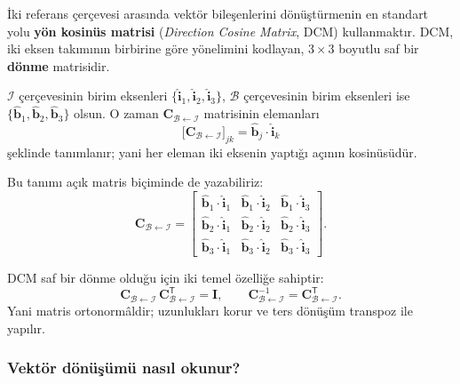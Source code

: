 İki referans çerçevesi arasında vektör bileşenlerini dönüştürmenin en standart yolu \textbf{yön kosinüs matrisi}
(\emph{Direction Cosine Matrix}, DCM) kullanmaktır. DCM, iki eksen takımının birbirine göre yönelimini kodlayan,
\textbf{$3\times3$} boyutlu saf bir \textbf{dönme} matrisidir.

$\mathcal I$ çerçevesinin birim eksenleri
$\{\hat{\mathbf i}_1,\hat{\mathbf i}_2,\hat{\mathbf i}_3\}$, $\mathcal B$ çerçevesinin birim eksenleri ise
$\{\hat{\mathbf b}_1,\hat{\mathbf b}_2,\hat{\mathbf b}_3\}$ olsun. O zaman
$\mathbf C_{\mathcal B\leftarrow\mathcal I}$ matrisinin elemanları
\begin{equation}
\label{eq:dcm_elements}
\big[\mathbf C_{\mathcal B\leftarrow\mathcal I}\big]_{jk}
=\hat{\mathbf b}_j \cdot \hat{\mathbf i}_k
\end{equation}
şeklinde tanımlanır; yani her eleman iki eksenin yaptığı açının kosinüsüdür.

Bu tanımı açık matris biçiminde de yazabiliriz:
\begin{equation}
\label{eq:dcm_matrix}
\mathbf C_{\mathcal B\leftarrow\mathcal I}=
\begin{bmatrix}
\hat{\mathbf b}_1\!\cdot\!\hat{\mathbf i}_1 & \hat{\mathbf b}_1\!\cdot\!\hat{\mathbf i}_2 & \hat{\mathbf b}_1\!\cdot\!\hat{\mathbf i}_3\\
\hat{\mathbf b}_2\!\cdot\!\hat{\mathbf i}_1 & \hat{\mathbf b}_2\!\cdot\!\hat{\mathbf i}_2 & \hat{\mathbf b}_2\!\cdot\!\hat{\mathbf i}_3\\
\hat{\mathbf b}_3\!\cdot\!\hat{\mathbf i}_1 & \hat{\mathbf b}_3\!\cdot\!\hat{\mathbf i}_2 & \hat{\mathbf b}_3\!\cdot\!\hat{\mathbf i}_3
\end{bmatrix}.
\end{equation}

DCM saf bir dönme olduğu için iki temel özelliğe sahiptir:
\begin{equation}
\label{eq:dcm_orthonormal}
\mathbf C_{\mathcal B\leftarrow\mathcal I}\,\mathbf C_{\mathcal B\leftarrow\mathcal I}^{\mathsf T}
=\mathbf I,
\qquad
\mathbf C_{\mathcal B\leftarrow\mathcal I}^{-1}
=\mathbf C_{\mathcal B\leftarrow\mathcal I}^{\mathsf T}.
\end{equation}
Yani matris ortonormâldir; uzunlukları korur ve ters dönüşüm transpoz ile yapılır.

\subsubsection{Vektör dönüşümü nasıl okunur?}
\label{subsubsec:vector_transform_read}

